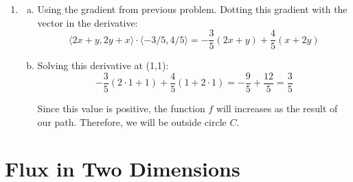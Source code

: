 \documentclass{article}
\begin{document}
\begin{enumerate}[1.]
  \item \begin{enumerate}[a.]
      \item Using the gradient from previous problem. Dotting this gradient with
        the vector in the derivative:
        $$ \langle 2x + y, 2y + x \rangle \cdot \langle -3/5, 4/5 \rangle =
        -\frac{ 3 }{ 5 }(2x + y) + \frac{ 4 }{ 5 }(x + 2y) $$

        \item Solving this derivative at (1,1):
          $$ -\frac{ 3 }{ 5 }(2 \cdot 1 + 1) + \frac{ 4 }{ 5 }(1 + 2 \cdot 1) =
          -\frac{ 9 }{ 5 } + \frac{ 12 }{ 5 } = \frac{ 3 }{ 5 } $$

          Since this value is positive, the function $f$ will increases as the
          result of our path. Therefore, we will be outside circle $C$.
    \end{enumerate}
\end{enumerate}

\section{Flux in Two Dimensions}
\end{document}
